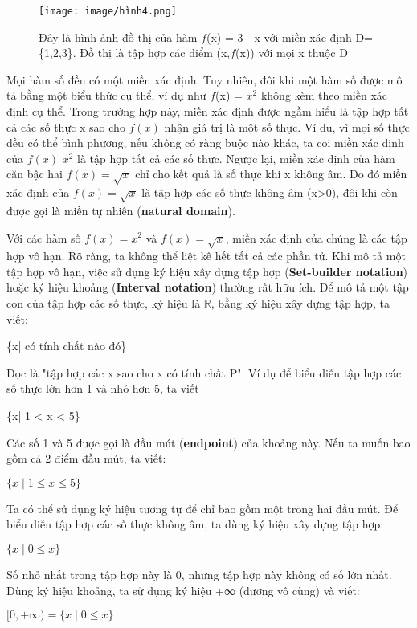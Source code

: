 \documentclass[a4paper,12pt,openany]{book}
\begin{document}
\begin{figure}[H]
    \centering
    \texttt{[image: image/hình4.png]}
    \caption{Đây là hình ảnh đồ thị của hàm $f$(x) = 3 - x với miền xác định D=\{1,2,3\}. Đồ thị là tập hợp các điểm (x,$f$(x)) với mọi x thuộc D }
    \label{fig:enter-label}
\end{figure}

\vspace{5pt}

Mọi hàm số đều có một miền xác định. Tuy nhiên, đôi khi một hàm số được mô tả bằng một biểu thức cụ thể, ví dụ như $f$(x) = \( x^2 \) không kèm theo miền xác định cụ thể. Trong trường hợp này, miền xác định được ngầm hiểu là tập hợp tất cả các số thực x sao cho $f(x)$ nhận giá trị là một số thực. Ví dụ, vì mọi số thực đều có thể bình phương, nếu không có ràng buộc nào khác, ta coi miền xác định của $f(x)$ \( x^2 \) là tập hợp tất cả các số thực. Ngược lại, miền xác định của hàm căn bậc hai \(f(x) = \sqrt{x} \) chỉ cho kết quả là số thực khi x không âm. Do đó miền xác định của \(f(x) = \sqrt{x} \) là tập hợp các số thực không âm (x>0), đôi khi còn được gọi là miền tự nhiên (\textbf{natural domain}).

\vspace{10pt}
Với các hàm số $f(x) = x^2$ và \(f(x) = \sqrt{x} \), miền xác định của chúng là các tập hợp vô hạn. Rõ ràng, ta không thể liệt kê hết tất cả các phần tử. Khi mô tả một tập hợp vô hạn, việc sử dụng ký hiệu xây dựng tập hợp (\textbf{Set-builder notation}) hoặc ký hiệu khoảng (\textbf{Interval notation}) thường rất hữu ích. Để mô tả một tập con của tập hợp các số thực, ký hiệu là \(\mathbb{R}\), bằng ký hiệu xây dựng tập hợp, ta viết:
\begin{center}
    \{x| có tính chất  nào đó\}
\end{center}
Đọc là "tập hợp các x sao cho x có tính chất P". Ví dụ để biểu diễn tập hợp các số thực lớn hơn 1 và nhỏ hơn 5, ta viết
\begin{center}
    \{x| 1 < x < 5\}
\end{center}
Các số 1 và 5 được gọi là đầu mút (\textbf{endpoint}) của khoảng này. Nếu ta muốn bao gồm cả 2 điểm đầu mút, ta viết:
\begin{center}
\(\{x \mid 1 \leq x \leq 5\}\)
\end{center}
Ta có thể sử dụng ký hiệu tương tự để chỉ bao gồm một trong hai đầu mút. Để biểu diễn tập hợp các số thực không âm, ta dùng ký hiệu xây dựng tập hợp:
\begin{center}
\(\{x \mid 0 \leq x\}\)
\end{center}
Số nhỏ nhất trong tập hợp này là 0, nhưng tập hợp này không có số lớn nhất. Dùng ký hiệu khoảng, ta sử dụng ký hiệu +∞ (dương vô cùng) và viết:
\begin{center}
 \([0,+\infty) = \{x \mid 0 \leq x\}\)
\end{center}
\end{document}

